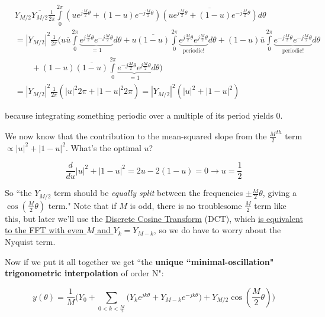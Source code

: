 \documentclass[10pt]{article}
\begin{document}
\begin{align*}
& Y_{M/2}\overline{Y_{M/2}}\frac{1}{2\pi} \int\limits_{0}^{2\pi} (ue^{j\frac{M}{2}\theta} + (1 - u)e^{-j\frac{M}{2}\theta}) \overline{(ue^{j\frac{M}{2}\theta} + (1 - u)e^{-j\frac{M}{2}\theta})} d\theta \\
&= |Y_{M/2}|^2 \frac{1}{2\pi} \Big(u\overline{u} \int\limits_{0}^{2\pi} \underbrace{e^{j\frac{M}{2}\theta} e^{-j\frac{M}{2}\theta}}_{= 1} d\theta + u \overline{(1 - u)} \int\limits_{0}^{2\pi} \underbrace{e^{j\frac{M}{2}\theta} e^{j\frac{M}{2}\theta}}_{\text{periodic!}} d\theta + (1 - u)\overline{u} \int\limits_{0}^{2\pi} \underbrace{e^{-j\frac{M}{2}\theta} e^{-j\frac{M}{2}\theta}}_{\text{periodic!}} d\theta \\
& \quad \quad + (1 - u) \overline{(1 - u)} \int\limits_{0}^{2\pi} \underbrace{e^{-j\frac{M}{2}\theta} e^{j\frac{M}{2}\theta}}_{= 1} d\theta \Big) \\
&= |Y_{M/2}|^2 \frac{1}{2\pi} (|u|^2 2\pi + |1 - u|^2 2\pi) = |Y_{M/2}|^2 (|u|^2 + |1 - u|^2)
\end{align*}

because integrating something periodic over a multiple of its period yields 0.\newline

We now know that the contribution to the mean-squared slope from the $\frac{M}{2}^{th}$ term $\propto |u|^2 + |1 - u|^2$. What's the optimal $u$?

$$\frac{d}{du} |u|^2 + |1 - u|^2 = 2u - 2(1-u) = 0 \longrightarrow u = \frac{1}{2}$$

So ``the $Y_{M/2}$ term should be \textit{equally split} between the frequencies $\pm\frac{M}{2}\theta$, giving a $\cos(\frac{M}{2}\theta)$ term." Note that if $M$ is odd, there is no troublesome $\frac{M}{2}$ term like this, but later we'll use the \href{https://docs.scipy.org/doc/scipy/reference/generated/scipy.fft.dct.html}{Discrete Cosine Transform}\cite{dct} (DCT), which \hyperref[fftdct]{is equivalent to the FFT with even $M$ and $Y_k = Y_{M-k}$}, so we do have to worry about the Nyquist term.

Now if we put it all together we get ``the \textbf{unique ``minimal-oscillation" trigonometric interpolation} of order N":

\begin{equation}\label{interpolant}
y(\theta) = \frac{1}{M} \Big(Y_0 + \sum_{0 < k < \frac{M}{2}} \big(Y_k e^{j k \theta} + Y_{M-k} e^{-j k \theta}\big) + Y_{M/2}\cos(\frac{M}{2}\theta) \Big)
\end{equation}
\end{document}
